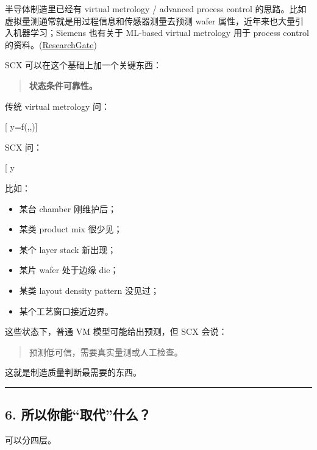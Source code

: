 \documentclass[
  12pt,
]{ctexart}
\providecommand{\tightlist}{%
  \setlength{\itemsep}{0pt}\setlength{\parskip}{0pt}}
\begin{document}
半导体制造里已经有 virtual metrology / advanced process control
的思路。比如虚拟量测通常就是用过程信息和传感器测量去预测 wafer
属性，近年来也大量引入机器学习；Siemens 也有关于 ML-based virtual
metrology 用于 process control
的资料。(\href{https://arxiv.org/abs/2505.05427?utm_source=chatgpt.com}{ResearchGate})

SCX 可以在这个基础上加一个关键东西：

\begin{quote}
\textbf{状态条件可靠性。}
\end{quote}

传统 virtual metrology 问：

{[} \hat y=f(,,){]}

SCX 问：

{[}  \hat y \text{ 在当前 process state 下可信吗？}{]}

比如：

\begin{itemize}
\tightlist
\item
  某台 chamber 刚维护后；
\item
  某类 product mix 很少见；
\item
  某个 layer stack 新出现；
\item
  某片 wafer 处于边缘 die；
\item
  某类 layout density pattern 没见过；
\item
  某个工艺窗口接近边界。
\end{itemize}

这些状态下，普通 VM 模型可能给出预测，但 SCX 会说：

\begin{quote}
预测低可信，需要真实量测或人工检查。
\end{quote}

这就是制造质量判断最需要的东西。

\begin{center}\rule{0.5\linewidth}{0.5pt}\end{center}

\subsection{6.
所以你能``取代''什么？}\label{ux6240ux4ee5ux4f60ux80fdux53d6ux4ee3ux4ec0ux4e48}

可以分四层。
\end{document}
